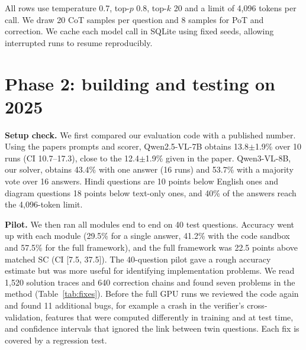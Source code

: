 \documentclass[conference]{IEEEtran}
\begin{document}
All rows use temperature 0.7, top-$p$ 0.8, top-$k$ 20 and a limit of 4{,}096 tokens per call. We
draw 20 CoT samples per question and 8 samples for PoT and correction. We cache each model call in SQLite using fixed seeds, allowing interrupted runs to resume reproducibly.

\section{Phase 2: building and testing on 2025}\label{sec:p2}
\textbf{Setup check.} We first compared our evaluation code with a published number. Using the papers prompts and scorer, Qwen2.5-VL-7B obtains 13.8$\pm$1.9\% over 10 runs (CI 10.7--17.3),
close to the 12.4$\pm$1.9\% given in the paper. Qwen3-VL-8B, our solver, obtains 43.4\% with one
answer (16 runs) and 53.7\% with a majority vote over 16 answers. Hindi questions are 10 points
below English ones and diagram questions 18 points below text-only ones, and 40\% of the answers
reach the 4{,}096-token limit.

\textbf{Pilot.} We then ran all modules end to end on 40 test questions. Accuracy went up with
each module (29.5\% for a single answer, 41.2\% with the code sandbox and 57.5\% for the full
framework), and the full framework was 22.5 points above matched SC (CI [7.5, 37.5]). The 40-question pilot gave a rough accuracy estimate but was more useful for identifying implementation problems.
We read 1{,}520 solution traces and 640 correction chains and found seven problems in the method
(Table~\ref{tab:fixes}). Before the full GPU runs we reviewed the code again and found 11 additional bugs, for example a crash in the verifier's cross-validation, features that were computed
differently in training and at test time, and confidence intervals that ignored the link between
twin questions. Each fix is covered by a regression test.
\end{document}
